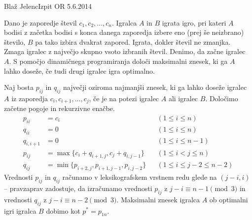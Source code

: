 \begin{naloga}{Blaž Jelenc}{Izpit OR 5.6.2014}
\begin{vprasanje}
Dano je zaporedje števil $c_1, c_2, \dots, c_n$.
Igralca $A$ in $B$ igrata igro,
pri kateri $A$ bodisi z začetka bodisi s konca danega zaporedja
izbere eno (prej še neizbrano) število,
$B$ pa tako izbira dvakrat zapored.
Igrata, dokler števil ne zmanjka.
Zmaga igralec z največjo skupno vsoto izbranih števil.
Denimo, da začne igralec $A$.
S pomočjo dinamičnega programiranja določi maksimalni znesek,
ki ga $A$ lahko doseže, če tudi drugi igralec igra optimalno.
\end{vprasanje}

\begin{odgovor}
Naj bosta $p_{ij}$ in $q_{ij}$ največji oziroma najmanjši znesek,
ki ga lahko doseže igralec $A$ iz zaporedja $c_i, c_{i+1}, \dots, c_j$,
če je na potezi igralec $A$ ali igralec $B$.
Določimo začetne pogoje in rekurzivne enačbe.
\begin{align*}
p_{ii} &= c_i && (1 \le i \le n) \\
q_{ii} &= 0 && (1 \le i \le n) \\
q_{i,i+1} &= 0 && (1 \le i \le n-1) \\
p_{ij} &= \max\{c_i + q_{i+1,j}, c_j + q_{i,j-1}\} && (1 \le i < j \le n) \\
q_{ij} &= \min\{p_{i+2,j}, p_{i+1,j-1}, p_{i,j-2}\} && (1 \le i \le j-2 \le n-2)
\end{align*}
Vrednosti $p_{ij}$ in $q_{ij}$ računamo
v leksikografskem vrstnem redu glede na $(j-i, i)$
-- pravzaprav zadostuje,
da izračunamo vrednosti $p_{ij}$ z $j-i \equiv n-1 \pmod{3}$
in vrednosti $q_{ij}$ z $j-i \equiv n-2 \pmod{3}$.
Maksimalni znesek igralca $A$ ob optimalni igri igralca $B$
dobimo kot $p^* = p_{1n}$.
\end{odgovor}
\end{naloga}
